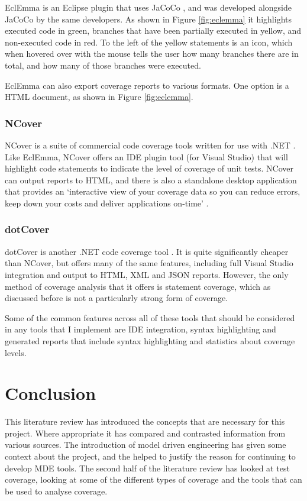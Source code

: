 EclEmma is an Eclipse plugin that uses JaCoCo \cite{EclEmma}, and was developed alongside JaCoCo by the same developers. As shown in Figure \ref{fig:eclemma} it highlights executed code in green, branches that have been partially executed in yellow, and non-executed code in red. To the left of the yellow statements is an icon, which when hovered over with the mouse tells the user how many branches there are in total, and how many of those branches were executed.

EclEmma can also export coverage reports to various formats. One option is a HTML document, as shown in Figure \ref{fig:eclemma}.

\subsubsection{NCover}

NCover is a suite of commercial code coverage tools written for use with .NET \citep{NCover}. Like EclEmma, NCover offers an IDE plugin tool (for Visual Studio) that will highlight code statements to indicate the level of coverage of unit tests. NCover can output reports to HTML, and there is also a standalone desktop application that provides an `interactive view of your coverage data so you can reduce errors, keep down your costs and deliver applications on-time' \citep{NCover}. 

\subsubsection{dotCover}

dotCover is another .NET code coverage tool \cite{dotCover}. It is quite significantly cheaper than NCover, but offers many of the same features, including full Visual Studio integration and output to HTML, XML and JSON reports. However, the only method of coverage analysis that it offers is statement coverage, which as discussed before is not a particularly strong form of coverage.

Some of the common features across all of these tools that should be considered in any tools that I implement are IDE integration, syntax highlighting and generated reports that include syntax highlighting and statistics about coverage levels.
\section{Conclusion}

This literature review has introduced the concepts that are necessary for this project. Where appropriate it has compared and contrasted information from various sources. The introduction of model driven engineering has given some context about the project, and the helped to justify the reason for continuing to develop MDE tools. The second half of the literature review has looked at test coverage, looking at some of the different types of coverage and the tools that can be used to analyse coverage.